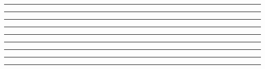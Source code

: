 \documentclass{article}
\begin{document}
\newpage
\noindent{}\rule{1cm}{0.025cm}

\newpage
\noindent{}\rule{1cm}{0.025cm}

\newpage
\noindent{}\rule{1cm}{0.025cm}

\newpage
\noindent{}\rule{1cm}{0.025cm}

\newpage
\noindent{}\rule{1cm}{0.025cm}

\newpage
\noindent{}\rule{1cm}{0.025cm}

\newpage
\noindent{}\rule{1cm}{0.025cm}

\newpage
\noindent{}\rule{1cm}{0.025cm}

\newpage
\noindent{}\rule{1cm}{0.025cm}
\end{document}
